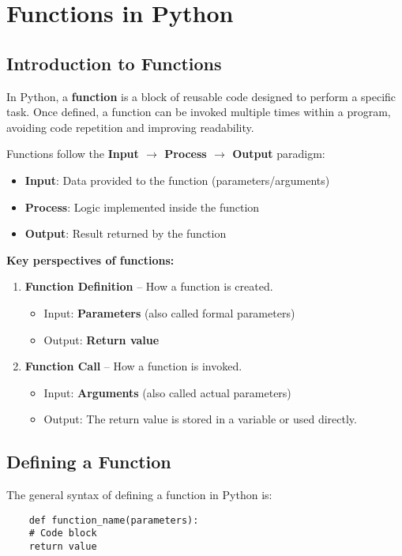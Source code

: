 \chapter{Functions in Python}

\section{Introduction to Functions}
In Python, a \textbf{function} is a block of reusable code designed to perform a specific task. Once defined, a function can be invoked multiple times within a program, avoiding code repetition and improving readability.

Functions follow the \textbf{Input $\rightarrow$ Process $\rightarrow$ Output} paradigm:
\begin{itemize}
	\item \textbf{Input}: Data provided to the function (parameters/arguments)
	\item \textbf{Process}: Logic implemented inside the function
	\item \textbf{Output}: Result returned by the function
\end{itemize}

\noindent \textbf{Key perspectives of functions:}
\begin{enumerate}
	\item \textbf{Function Definition} – How a function is created.
	\begin{itemize}
		\item Input: \textbf{Parameters} (also called formal parameters)
		\item Output: \textbf{Return value}
	\end{itemize}
	\item \textbf{Function Call} – How a function is invoked.
	\begin{itemize}
		\item Input: \textbf{Arguments} (also called actual parameters)
		\item Output: The return value is stored in a variable or used directly.
	\end{itemize}
\end{enumerate}

\section{Defining a Function}
The general syntax of defining a function in Python is:
\begin{verbatim}
	def function_name(parameters):
	# Code block
	return value
\end{verbatim}

